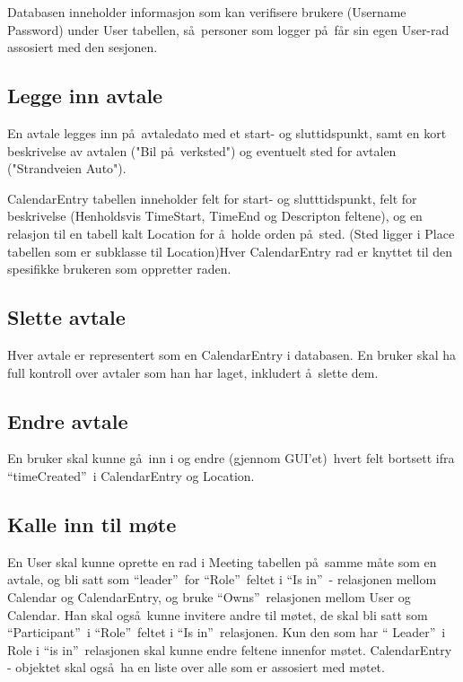 \documentclass{article}
\begin{document}
Databasen inneholder informasjon som kan verifisere brukere (Username
Password) under User tabellen, s\aa\ personer som logger p\aa\ f\aa r sin
egen User-rad assosiert med den sesjonen.

\subsection{Legge inn avtale}

En avtale legges inn p\aa\ avtaledato med et start- og sluttidspunkt, samt
en kort beskrivelse av avtalen ("Bil p\aa\ verksted") og eventuelt sted for
avtalen ("Strandveien Auto").

CalendarEntry tabellen inneholder felt for start- og slutttidspunkt, felt
for beskrivelse (Henholdsvis TimeStart, TimeEnd og Descripton feltene), og
en relasjon til en tabell kalt Location for \aa\ holde orden p\aa\ sted.
(Sted ligger i Place tabellen som er subklasse til Location)Hver
CalendarEntry rad er knyttet til den spesifikke brukeren som oppretter raden.

\subsection{Slette avtale}

Hver avtale er representert som en CalendarEntry i databasen. En bruker skal
ha full kontroll over avtaler som han har laget, inkludert \aa\ slette dem.

\subsection{Endre avtale}

En bruker skal kunne g\aa\ inn i og endre (gjennom GUI'et)\ hvert felt
bortsett ifra \textquotedblleft timeCreated\textquotedblright\ i
CalendarEntry og Location.

\subsection{Kalle inn til m\o te}

En User skal kunne oprette en rad i Meeting tabellen p\aa\ samme m\aa te som
en avtale, og bli satt som \textquotedblleft leader\textquotedblright\ for
\textquotedblleft Role\textquotedblright\ feltet i \textquotedblleft Is
in\textquotedblright\ - relasjonen mellom Calendar og CalendarEntry, og
bruke \textquotedblleft Owns\textquotedblright\ relasjonen mellom User og
Calendar. Han skal ogs\aa\ kunne invitere andre til m\o tet, de skal bli
satt som \textquotedblleft Participant\textquotedblright\ i
\textquotedblleft Role\textquotedblright\ feltet i \textquotedblleft Is
in\textquotedblright\ relasjonen. Kun den som har \textquotedblleft
Leader\textquotedblright\ i Role i \textquotedblleft is
in\textquotedblright\ relasjonen skal kunne endre feltene innenfor m\o tet.
CalendarEntry - objektet skal ogs\aa\ ha en liste over alle som er assosiert
med m\o tet.
\end{document}
